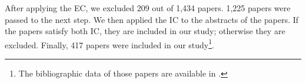 %

After applying the EC, we excluded 209 out of 1,434 papers. 1,225 papers were passed to the next step. We then applied the IC to the abstracts of the papers. If the papers satisfy both IC, they are included in our study; otherwise they are excluded. Finally, 417 papers were included in our study\footnote{The bibliographic data of those papers are available in \cite{rep-pkg-privul}.}.

